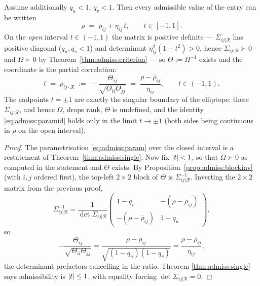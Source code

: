 \begin{corollary}\label{cor:admiss:partial}
Assume additionally $q_u < 1$, $q_v < 1$. Then every admissible value of
the entry can be written
\begin{equation}\label{eq:admiss:param}
  \rho \;=\; \bar\rho_{ij} + \eta_{ij}\, t,
  \qquad t \in [-1, 1] .
\end{equation}
On the \emph{open} interval $t \in (-1, 1)$ the matrix is positive
definite --- $\Sigma_{ij|\mathcal{R}}$ has positive diagonal ($q_u, q_v <
1$) and determinant $\eta_{ij}^2 (1 - t^2) > 0$, hence
$\Sigma_{ij|\mathcal{R}} \succ 0$ and $\Omega \succ 0$ by
Theorem~\ref{thm:admiss:criterion} --- so $\Theta := \Omega^{-1}$ exists
and the coordinate is the partial correlation:
\begin{equation}\label{eq:admiss:paramid}
  t \;=\; \rho_{ij \cdot \mathcal{R}}
  \;:=\; -\frac{\Theta_{ij}}{\sqrt{\Theta_{ii}\Theta_{jj}}}
  \;=\; \frac{\rho - \bar\rho_{ij}}{\eta_{ij}},
  \qquad t \in (-1, 1) .
\end{equation}
The endpoints $t = \pm 1$ are exactly the singular boundary of the
elliptope: there $\Sigma_{ij|\mathcal{R}}$, and hence $\Omega$, drops rank,
$\Theta$ is undefined, and the identity \eqref{eq:admiss:paramid} holds
only in the limit $t \to \pm 1$ (both sides being continuous in $\rho$ on
the open interval).
\end{corollary}

\begin{proof}
The parametrisation \eqref{eq:admiss:param} over the closed interval is a
restatement of Theorem~\ref{thm:admiss:single}. Now fix $\lvert t\rvert < 1$, so
that $\Omega \succ 0$ as computed in the statement and $\Theta$ exists.
By Proposition~\ref{prop:admiss:blockinv} (with $i, j$ ordered first), the
top-left $2 \times 2$ block of $\Theta$ is $\Sigma_{ij|\mathcal{R}}^{-1}$.
Inverting the $2 \times 2$ matrix from the previous proof,
\[
  \Sigma_{ij|\mathcal{R}}^{-1}
  = \frac{1}{\det \Sigma_{ij|\mathcal{R}}}
    \begin{pmatrix}
      1 - q_v & -(\rho - \bar\rho_{ij}) \\
      -(\rho - \bar\rho_{ij}) & 1 - q_u
    \end{pmatrix},
\]
so
\[
  -\frac{\Theta_{ij}}{\sqrt{\Theta_{ii}\Theta_{jj}}}
  = \frac{\rho - \bar\rho_{ij}}
         {\sqrt{(1 - q_u)(1 - q_v)}}
  = \frac{\rho - \bar\rho_{ij}}{\eta_{ij}} ,
\]
the determinant prefactors cancelling in the ratio. Theorem
\ref{thm:admiss:single} says admissibility is $\lvert t\rvert \le 1$, with
equality forcing $\det \Sigma_{ij|\mathcal{R}} = 0$.
\end{proof}

